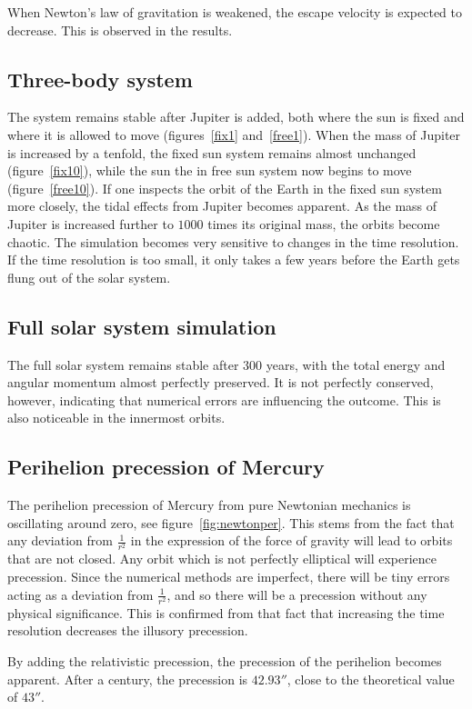 \documentclass[aps,reprint]{revtex4-1}
\begin{document}
When Newton's law of gravitation is weakened, the escape velocity is expected
to decrease. This is observed in the results.
\subsection{Three-body system}
The system remains stable after Jupiter is added, both where the sun is fixed
and where it is allowed to move (figures~\ref{fix1} and~\ref{free1}).
When the mass of Jupiter is increased by a
tenfold, the fixed sun system remains almost unchanged (figure~\ref{fix10}), while the sun the in
free sun system now begins to move (figure~\ref{free10}). If one inspects the orbit of the Earth in
the fixed sun system more closely, the tidal effects from Jupiter becomes
apparent. As the mass of Jupiter is increased further to \(1000\) times its
original mass, the orbits become chaotic. The simulation becomes very sensitive
to changes in the time resolution. If the time resolution is too small, it only
takes a few years before the Earth gets flung out of the solar system.

\subsection{Full solar system simulation}
The full solar system remains stable after \(300\) years, with the total energy
and angular momentum almost perfectly preserved. It is not perfectly conserved,
however, indicating that numerical errors are influencing the outcome. This is
also noticeable in the innermost orbits.

\subsection{Perihelion precession of Mercury}
The perihelion precession of Mercury from pure Newtonian mechanics is
oscillating around zero, see figure~\ref{fig:newtonper}. This stems from the
fact that any deviation from \(\frac{1}{r^{2}}\) in the expression of the force
of gravity will lead to orbits that are not closed. Any orbit which is not
perfectly elliptical will experience precession. Since the numerical methods
are imperfect, there will be tiny errors acting as a deviation from
\(\frac{1}{r^{2}}\), and so there will be a precession without any physical
significance. This is confirmed from that fact that increasing the time
resolution decreases the illusory precession.

By adding the relativistic precession, the precession of the perihelion becomes
apparent. After a century, the precession is \(42.93''\), close to the theoretical
value of \(43''\).
\end{document}
